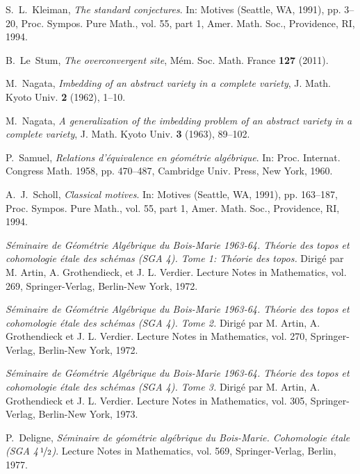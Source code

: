 \documentclass[11pt]{amsart}
\theoremstyle{definition}
\begin{document}
\begin{thebibliography}{10000000}
S.~L.~Kleiman, \emph{The standard conjectures}.
  In: Motives ({S}eattle, {WA}, 1991), pp. 3--20,
Proc. Sympos. Pure Math., vol. 55, part 1, Amer. Math. Soc.,
  Providence, RI, 1994.

B.~Le~Stum, \emph{The overconvergent site}, M\'{e}m. Soc. Math. France
\textbf{127} (2011).

M.~Nagata, \emph{Imbedding of an abstract variety in a complete
variety}, J. Math. Kyoto Univ. {\bf 2} (1962), 1--10.

M.~Nagata, \emph{A generalization of the imbedding problem of an
abstract variety in a complete
  variety},
J. Math. Kyoto Univ. {\bf 3} (1963), 89--102.

P.~Samuel, \emph{Relations d'\'equivalence en g\'eom\'etrie
  alg\'ebrique}.
  In: Proc. {I}nternat. {C}ongress {M}ath. 1958, pp. 470--487, Cambridge
  Univ. Press, New York, 1960.

A.~J.~Scholl, \emph{Classical motives}. In: Motives ({S}eattle,
{WA}, 1991), pp. 163--187, Proc. Sympos. Pure Math., vol. 55, part
1, Amer. Math. Soc.,
  Providence, RI, 1994.

\emph{S\'eminaire de G\'eom\'etrie Alg\'ebrique du Bois-Marie
1963-64. Th\'eorie des topos et cohomologie \'etale des sch\'emas
(SGA 4). Tome 1: Th\'eorie des topos.} Dirig\'e par M. Artin, A.
Grothendieck, et J. L. Verdier. Lecture Notes in Mathematics, vol.
269, Springer-Verlag, Berlin-New York, 1972.

\emph{S\'eminaire de G\'eom\'etrie Alg\'ebrique du Bois-Marie
1963-64. Th\'eorie des topos et cohomologie \'etale des sch\'emas
(SGA 4). Tome 2.} Dirig\'e par M. Artin, A. Grothendieck et J. L.
Verdier. Lecture Notes in Mathematics, vol. 270, Springer-Verlag,
Berlin-New York, 1972.

\emph{S\'eminaire de G\'eom\'etrie Alg\'ebrique du Bois-Marie
1963-64. Th\'eorie des topos et cohomologie \'etale des sch\'emas
(SGA 4). Tome 3.} Dirig\'e par M. Artin, A. Grothendieck et J. L.
Verdier. Lecture Notes in Mathematics, vol. 305, Springer-Verlag,
Berlin-New York, 1973.

P.~Deligne, \emph{S\'{e}minaire de g\'{e}om\'{e}trie alg\'{e}brique
du Bois-Marie. Cohomologie
  \'{e}tale (SGA 4\,$\nicefrac{1}{2}$)}.
Lecture Notes in Mathematics, vol. 569, Springer-Verlag,
  Berlin, 1977.


\end{thebibliography}
\end{document}
